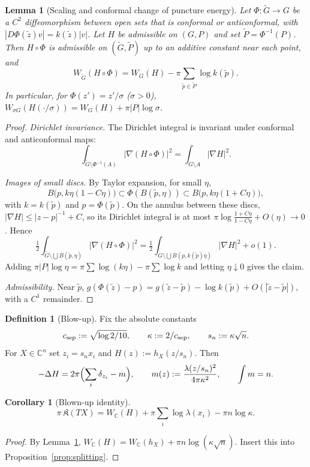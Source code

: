 \documentclass[11pt]{article}
\newtheorem{lemma}[theorem]{Lemma}
\newtheorem{corollary}[theorem]{Corollary}
\theoremstyle{definition}
\newtheorem{definition}[theorem]{Definition}
\theoremstyle{remark}
\newcommand{\C}{\mathbb C}
\begin{document}
\begin{lemma}[Scaling and conformal change of puncture energy]\label{lem:conformal}
Let $\Phi:\tilde G\to G$ be a $C^2$ diffeomorphism between open sets that is conformal or
anticonformal, with $|D\Phi(\tilde z)v|=k(\tilde z)|v|$. Let $H$ be admissible on $(G,P)$ and set
$\tilde P=\Phi^{-1}(P)$. Then $H\circ\Phi$ is admissible on $(\tilde G,\tilde P)$ up to an additive
constant near each point, and
\[
W_{\tilde G}(H\circ\Phi)=W_G(H)-\pi\sum_{\tilde p\in\tilde P}\log k(\tilde p).
\]
In particular, for $\Phi(z')=z'/\sigma$ ($\sigma>0$), $W_{\sigma G}(H(\cdot/\sigma))=W_G(H)+\pi|P|\log\sigma$.
\end{lemma}
\begin{proof}
\emph{Dirichlet invariance.} The Dirichlet integral is invariant under conformal and anticonformal
maps:
\[
\int_{\tilde G\setminus\Phi^{-1}(A)}|\nabla(H\circ\Phi)|^2=\int_{G\setminus A}|\nabla H|^2 .
\]

\emph{Images of small discs.} By Taylor expansion, for small $\eta$,
\[
B\bigl(p,k\eta(1-C\eta)\bigr)\subset\Phi(B(\tilde p,\eta))\subset B\bigl(p,k\eta(1+C\eta)\bigr),
\]
with $k=k(\tilde p)$ and $p=\Phi(\tilde p)$. On the annulus between these discs,
$|\nabla H|\le|z-p|^{-1}+C$, so its Dirichlet integral is at most
$\pi\log\frac{1+C\eta}{1-C\eta}+O(\eta)\to0$. Hence
\[
\tfrac12\int_{\tilde G\setminus\bigcup B(\tilde p,\eta)}|\nabla(H\circ\Phi)|^2
=\tfrac12\int_{G\setminus\bigcup B(p,k(\tilde p)\eta)}|\nabla H|^2+o(1).
\]
Adding $\pi|P|\log\eta=\pi\sum\log(k\eta)-\pi\sum\log k$ and letting $\eta\downarrow0$ gives the
claim.

\emph{Admissibility.} Near $\tilde p$, $g(\Phi(\tilde z)-p)=g(\tilde z-\tilde p)-\log k(\tilde p)+O(|\tilde z-\tilde p|)$, with a $C^1$ remainder.
\end{proof}

\begin{definition}[Blow-up]\label{def:blowup}
Fix the absolute constants
\[
c_{\rm sep}:=\sqrt{\log2/10},\qquad \kappa:=2/c_{\rm sep},\qquad s_n:=\kappa\sqrt n .
\]
For $X\in\C^n$ set $z_i=s_nx_i$ and $H(z):=h_X(z/s_n)$. Then
\[
-\Delta H=2\pi\Bigl(\sum_i\delta_{z_i}-m\Bigr),\qquad
m(z):=\frac{\lambda(z/s_n)^2}{4\pi\kappa^2},\qquad \int m=n .
\]
\end{definition}

\begin{corollary}[Blown-up identity]\label{cor:blown}
\[
\pi\,\mathfrak K(TX)=W_\C(H)+\pi\sum_i\log\lambda(x_i)-\pi n\log\kappa .
\]
\end{corollary}
\begin{proof}
By Lemma~\ref{lem:conformal}, $W_\C(H)=W_\C(h_X)+\pi n\log(\kappa\sqrt n)$. Insert this into
Proposition~\ref{prop:splitting}.
\end{proof}
\end{document}
